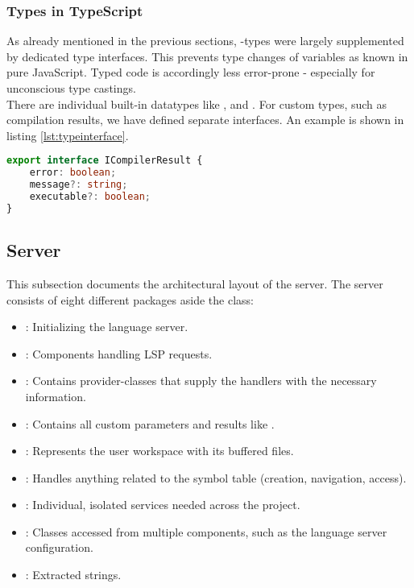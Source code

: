 \pagebreak
\subsubsection{Types in TypeScript}
As already mentioned in the previous sections, -types were largely supplemented by dedicated type interfaces.
This prevents type changes of variables as known in pure JavaScript.
Typed code is accordingly less error-prone - especially for unconscious type castings. \\

There are individual built-in datatypes like ,  and  \cite{ts-types}.
For custom types, such as compilation results, we have defined separate interfaces.
An example is shown in listing \ref{lst:typeinterface}.

\begin{lstlisting}[language=typescript, caption={Type Interface Supplementing \code{any}-types}, captionpos=b, label={lst:typeinterface}]
export interface ICompilerResult {
    error: boolean;
    message?: string;
    executable?: boolean;
}
\end{lstlisting}




\subsection{Server}
This subsection documents the architectural layout of the server.
The server consists of eight different packages aside the  class:
\begin{itemize}
    \item {}: Initializing the language server.
    \item {}: Components handling LSP requests.
    \item {}: Contains provider-classes that supply the handlers with the necessary information.
    \item {}: Contains all custom parameters and results like .
    \item {}: Represents the user workspace with its buffered files.
    \item {}: Handles anything related to the symbol table (creation, navigation, access).
    \item {}: Individual, isolated services needed across the project.
    \item {}: Classes accessed from multiple components, such as the language server configuration.
    \item {}: Extracted strings.
\end{itemize}

